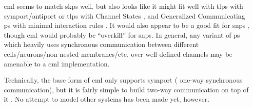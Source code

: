\gls{cml} seems to match \gls{skps} well, but also looks like it might fit well with \gls{tlps} with symport/antiport \cite{Verlan2005} or \gls{tlps} with Channel States \cite{Song2016}, and Generalized Communicating \gls{ps} with minimal interaction rules \cite{Csuhaj-Varju2011}.  It would also appear to be a good fit for \gls{snps} \cite{Ionescu2006}, though \gls{cml} would probably be ``overkill'' for \gls{snps}.  In general, any variant of \gls{ps} which heavily uses synchronous communication between different cells/neurons/non-nested membranes/etc. over well-defined channels may be amenable to a \gls{cml} implementation.

Technically, the base form of \gls{cml} only supports symport (\ie{} one-way synchronous communication), but it is fairly simple to build two-way communication on top of it \cite[ch.~6]{Reppy2007}.  No attempt to model other systems has been made yet, however.